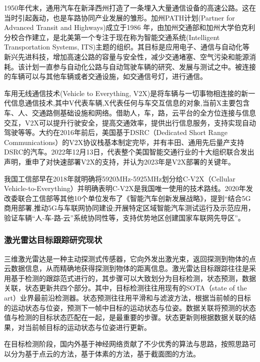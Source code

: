 1950年代末，通用汽车在新泽西州打造了一条埋入大量通信设备的高速公路。这在当时引起轰动，也是车路协同产业发展的雏形。加州PATH计划(Partner for Advanced Transit and Highways)成立于1986 年，由加州交通部和加州大学伯克利分校合作建立，是北美第一个专注于现在称为智能交通系统(Intelligent Transportation Systems, ITS)主题的组织。其目标是应用电子、通信与自动化等新兴先进科技，增加高速公路的容量与安全性，减少交通堵塞、空气污染和能源消耗。该计划一直参与自动化公路与自动驾驶车辆的研究、发展与测试之中。被连接的车辆可以与其他车辆或者交通设施，如交通信号灯，进行通信。\cite{xinyanan2022}

车用无线通信技术(Vehicle to Everything, V2X)是将车辆与一切事物相连接的新一代信息通信技术,其中V代表车辆,X代表任何与车交互信息的对象,当前X主要包含车、人、交通路侧基础设施和网络。借助人，车，路，云平台的全方位连接与信息交互，V2X可以提升行驶安全，提高交通效率，提供出行信息服务，支持实现自动驾驶等等。大约在2016年前后，美国基于DSRC（Dedicated Short Range Communications）的V2X协议栈基本制定完毕，并有丰田、通用先后量产支持DSRC的汽车。2022年12月13日，代表整个美国智能交通行业的十大组织联合发出声明，重申了对快速部署V2X的支持，并认为2023年是V2X部署的关键年。

我国工信部早在2018年就明确将5920MHz-5925MHz划分给C-V2X（Cellular Vehicle-to-Everything）并明确表明C-V2X是我国唯一使用的技术路线。2020年发改委联合工信部等其他10个单位发布了《智能汽车创新发展战略》，提到“结合5G商用部署,推动5G与车联网协同建设;开展特定区域智能汽车测试运行及示范应用，验证车辆“人-车-路-云”系统协同性等，支持优势地区创建国家车联网先导区”。

\subsubsection{激光雷达目标跟踪研究现状}

三维激光雷达是一种主动探测式传感器，它向外发出激光束，返回探测到物体的点云数据信息，从而精确地获得探测到物体的距离信息。激光雷达目标跟踪往往是采用基于检测的跟踪范式进行的，其步骤可以大致划分为目标检测，状态预测，数据关联，状态更新共四个部分。其中，目标检测往往用现有的SOTA（state of the art）业界最前沿检测器。状态预测往往用平滑和与滤波方法，根据当前帧的目标的运动状态与位姿，预测下一帧中目标的运动状态与位姿。数据关联将预测的状态值与检测的目标状态匹配在一起，是最重要的步骤。状态更新则根据数据关联的结果，对当前帧目标的运动状态与位姿进行更新。

在目标检测阶段，国内外基于神经网络贡献了不少优秀的算法与思路，按照思路可以分为基于点云的方法，基于体素的方法，基于截面图的方法。\cite{mao20223d}

